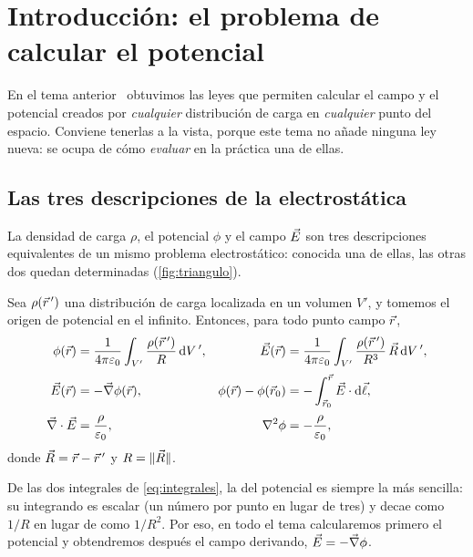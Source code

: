 \section{Introducción: el problema de calcular el potencial}\label{sec:intro}
En el tema anterior~\cite{TEMA1} obtuvimos las leyes que permiten calcular el campo y el potencial creados por
\emph{cualquier} distribución de carga en \emph{cualquier} punto del espacio. Conviene tenerlas a la vista,
porque este tema no añade ninguna ley nueva: se ocupa de cómo \emph{evaluar} en la práctica una de ellas.

\subsection{Las tres descripciones de la electrostática}\label{sec:triangulo}
La densidad de carga $\rho$, el potencial $\phi$ y el campo $\vec{E}$ son tres descripciones equivalentes de un mismo problema
electrostático: conocida una de ellas, las otras dos quedan determinadas (\cref{fig:triangulo}).

\begin{proposicion}\label{prop:triangulo}
Sea $\rho(\vec{r}\,')$ una distribución de carga localizada en un volumen $V'$, y tomemos el origen de potencial en el infinito. Entonces,
para todo punto campo $\vec{r}$,
\begin{align}
  \phi(\vec{r})&=\frac{1}{4\pi\varepsilon_{0}}\int_{V'}\frac{\rho(\vec{r}\,')}{R}\,\mathrm{d} V\,', &
  \vec{E}(\vec{r})&=\frac{1}{4\pi\varepsilon_{0}}\int_{V'}\frac{\rho(\vec{r}\,')}{R^{3}}\,\vec{R}\,\mathrm{d} V\,',\label{eq:integrales}\\[2pt]
  \vec{E}(\vec{r})&=-\vec{\nabla}\phi(\vec{r}), &
  \phi(\vec{r})-\phi(\vec{r}_0)&=-\int_{\vec{r}_0}^{\vec{r}}\vec{E}\cdot\mathrm{d}\vec{\ell},\label{eq:E-phi}\\[2pt]
  \vec{\nabla}\cdot\vec{E}&=\frac{\rho}{\varepsilon_{0}}, &
  \nabla^{2}\phi&=-\frac{\rho}{\varepsilon_{0}},\label{eq:poisson}
\end{align}
donde $\vec{R}=\vec{r}-\vec{r}\,'$ y $R=\lVert \vec{R}\rVert$.
\end{proposicion}



\begin{observacion}\label{obs:potencial-escalar}
De las dos integrales de \cref{eq:integrales}, la del potencial es siempre la más sencilla: su integrando es escalar (un número por
punto en lugar de tres) y decae como $1/R$ en lugar de como $1/R^{2}$. Por eso, en todo el tema calcularemos primero el potencial y
obtendremos después el campo derivando, $\vec{E}=-\vec{\nabla}\phi$.
\end{observacion}

